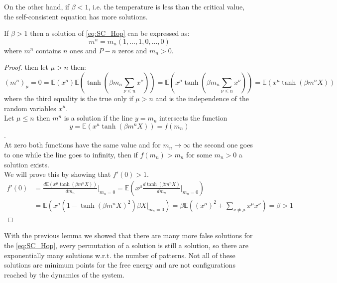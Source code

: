 On the other hand, if $\beta < 1$, i.e. the temperature is less than the critical value, the self-consistent equation has more solutions.
\begin{lemma}
    If $\beta > 1$ then a solution of \cref{eq:SC_Hop} can be expressed as:
    \[
    m^n= m_n(1,\ldots,1,0,\ldots,0)
    \]
    where $m^n$ contains $n$ ones and $P-n$ zeros and $m_n>0$.
    \begin{proof}
    	then let $\mu >n $ then:
    	\[
    	(m^n)_\mu = 0 = \mathbb{E}(x^\mu)\mathbb{E}(\tanh(\beta m_n \sum_{\nu \leq n} x^\nu)) =  \mathbb{E}(x^\mu \tanh(\beta m_n \sum_{\nu \leq n} x^\nu)) = \mathbb{E}(x^\mu \tanh(\beta m^n X))
    	\]
    	where the third equality is the true only if $\mu >n$ and is the independence of the random variables $x^\mu$.\\
    	Let $\mu \leq n$ then $m^n$ is a solution if the line $y = m_n$ intersects the function $$y =  \mathbb{E}(x^\mu \tanh(\beta m^n X))=f(m_n)$$. \\
    	At zero both functions have the same value and for $m_n \to \infty$ the second one goes to one while the line goes to infinity, then if $f(m_n) > m_n$ for some $m_n >0$ a solution exists.\\
    	We will prove this by showing that $f'(0) > 1$.
    	\begin{align*}
    		f'(0) &= \frac{d\mathbb{E}(x^\mu \tanh(\beta m^n X))}{dm_n} \big|_{m_n=0} = \mathbb{E}(x^\mu \frac{d \tanh(\beta m^n X)}{dm_n} \big|_{m_n=0} ) \\
    		&= \mathbb{E}(x^\mu  (1 - \tanh(\beta m^n X)^2 ) \beta X \big|_{m_n=0} ) =\beta  \mathbb{E}((x^\mu)^2 + \sum_{\nu \neq \mu } x^\mu x^\nu ) = \beta > 1
    	\end{align*}
    \end{proof}
\end{lemma}
With the previous lemma we showed that there are many more false solutions for the \cref{eq:SC_Hop}, every permutation of a solution is still a solution, so there are exponentially many solutions w.r.t. the number of patterns. Not all of these solutions are minimum points for the free energy and are not configurations reached by the dynamics of the system.
